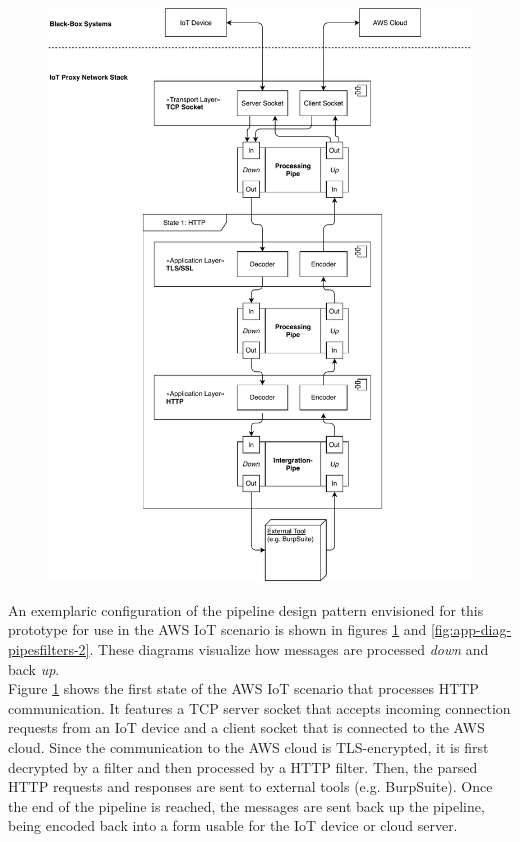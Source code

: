 \begin{figure}[h!]
    \centering
    \includegraphics[width=14cm]{img/ch04/Architecture - PipesFilters 1.pdf}
    \label{fig:app-diag-pipesfilters-1}
\end{figure}
An exemplaric configuration of the pipeline design pattern envisioned for this prototype for use in the \ac{AWS} \ac{IoT} scenario is shown in figures \ref{fig:app-diag-pipesfilters-1} and \ref{fig:app-diag-pipesfilters-2}. These diagrams visualize how messages are processed \emph{down} and back \emph{up}.\\
Figure \ref{fig:app-diag-pipesfilters-1} shows the first state of the \ac{AWS} \ac{IoT} scenario that processes \ac{HTTP} communication. It features a TCP server socket that accepts incoming connection requests from an \ac{IoT} device and a client socket that is connected to the \ac{AWS} cloud. Since the communication to the \ac{AWS} cloud is \ac{TLS}-encrypted, it is first decrypted by a filter and then processed by a \ac{HTTP} filter. Then, the parsed \ac{HTTP} requests and responses are sent to external tools (e.g. BurpSuite). Once the end of the pipeline is reached, the messages are sent back up the pipeline, being encoded back into a form usable for the \ac{IoT} device or cloud server.\\
